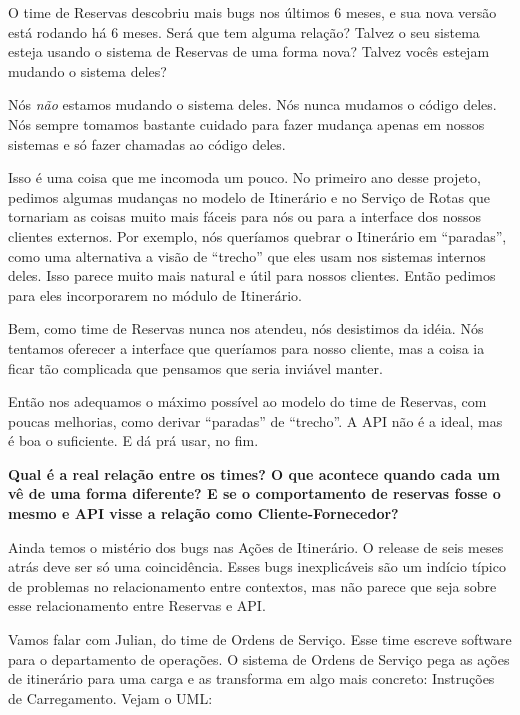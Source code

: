 \documentclass[12pt,play]{article}
\begin{document}
\narr {}
\scene
\dani O time de Reservas descobriu mais bugs nos últimos 6 meses, e sua nova versão está rodando há 6 meses. Será que tem alguma relação? Talvez o seu sistema esteja usando o sistema de Reservas de uma forma nova? Talvez vocês estejam mudando o sistema deles?

\joao {} Nós \emph{não} estamos mudando o sistema deles. Nós nunca mudamos o código deles. Nós sempre tomamos bastante cuidado para fazer mudança apenas em nossos sistemas e só fazer chamadas ao código deles.

Isso é uma coisa que me incomoda um pouco. No primeiro ano desse projeto, pedimos algumas mudanças no modelo de Itinerário e no Serviço de Rotas que tornariam as coisas muito mais fáceis para nós ou para a interface dos nossos clientes externos. Por exemplo, nós queríamos quebrar o Itinerário em ``paradas'', como uma alternativa a visão de ``trecho'' que eles usam nos sistemas internos deles. Isso parece muito mais natural e útil para nossos clientes. Então pedimos para eles incorporarem no módulo de Itinerário.

Bem, como time de Reservas nunca nos atendeu, nós desistimos da idéia. Nós tentamos oferecer a interface que queríamos para nosso cliente, mas a coisa ia ficar tão complicada que pensamos que seria inviável manter.

Então nos adequamos o máximo possível ao modelo do time de Reservas, com poucas melhorias, como derivar ``paradas'' de ``trecho''. A API não é a ideal, mas é boa o suficiente. E dá prá usar, no fim.

\narr \textbf{ Qual é a real relação entre os times? O que acontece quando cada um vê de uma forma diferente? E se o comportamento de reservas fosse o mesmo e API visse a relação como Cliente-Fornecedor?}


\narr Ainda temos o mistério dos bugs nas Ações de Itinerário. O release de seis meses atrás deve ser só uma coincidência. Esses bugs inexplicáveis são um indício típico de problemas no relacionamento entre contextos, mas não parece que seja sobre esse relacionamento entre Reservas e API.

\act
\narr Vamos falar com Julian, do time de Ordens de Serviço. Esse time escreve software para o departamento de operações.
\narr {} O sistema de Ordens de Serviço pega as ações de itinerário para uma carga e as transforma em algo mais concreto: Instruções de Carregamento. Vejam o UML:
\end{document}
